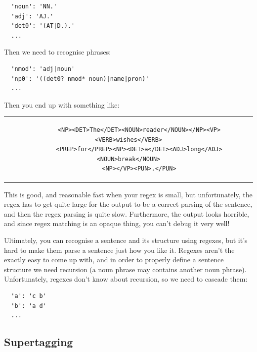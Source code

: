 \begin{verbatim}
  'noun': 'NN.'
  'adj': 'AJ.'
  'det0': '(AT|D.).'
  ...
\end{verbatim}

Then we need to recognise phrases:

\begin{verbatim}
  'nmod': 'adj|noun'
  'np0': '((det0? nmod* noun)|name|pron)'
  ...
\end{verbatim}

Then you end up with something like:

\begin{center}
  \begin{tabular}{c}
    \begin{lstlisting}
      <NP><DET>The</DET><NOUN>reader</NOUN></NP><VP><VERB>wishes</VERB>
      <PREP>for</PREP><NP><DET>a</DET><ADJ>long</ADJ><NOUN>break</NOUN>
      <NP></VP><PUN>.</PUN>
    \end{lstlisting}
  \end{tabular}
\end{center}


This is good, and reasonable fast when your regex is small, but unfortunately,
the regex has to get quite large for the output to be a correct parsing of the
sentence, and then the regex parsing is quite slow. Furthermore, the output
looks horrible, and since regex matching is an opaque thing, you can't debug it
very well!

Ultimately, you can recognise a sentence and its structure using regexes, but
it's hard to make them parse a sentence just how you like it. Regexes aren't the
exactly easy to come up with, and in order to properly define a sentence
structure we need recursion (a noun phrase may contains another noun phrase).
Unfortunately, regexes don't know about recursion, so we need to cascade them:

\begin{verbatim}
  'a': 'c b'
  'b': 'a d'
  ...
\end{verbatim}

\subsection{Supertagging}

